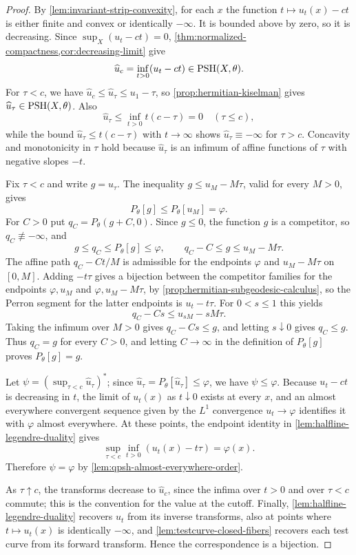 \begin{proof}
By \cref{lem:invariant-strip-convexity}, for each $x$ the function $t\mapsto u_t(x)-ct$ is either finite and convex or identically $-\infty$. It is bounded above by zero, so it is decreasing. Since $\sup_X(u_t-ct)=0$, \cref{thm:normalized-compactness,cor:decreasing-limit} give
\[
 \widehat u_c=\inf_{t>0}(u_t-ct)\in\mathrm{PSH}(X,\theta).
\]
For $\tau<c$, we have $\widehat u_c\leq\widehat u_\tau\leq u_1-\tau$, so \cref{prop:hermitian-kiselman} gives $\widehat u_\tau\in\mathrm{PSH}(X,\theta)$. Also
\[
 \widehat u_\tau\leq\inf_{t>0}t(c-\tau)=0
 \quad(\tau\leq c),
\]
while the bound $\widehat u_\tau\leq t(c-\tau)$ with $t\to\infty$ shows $\widehat u_\tau\equiv-\infty$ for $\tau>c$. Concavity and monotonicity in $\tau$ hold because $\widehat u_\tau$ is an infimum of affine functions of $\tau$ with negative slopes $-t$.

Fix $\tau<c$ and write $g=\widehat u_\tau$. The inequality $g\leq u_M-M\tau$, valid for every $M>0$, gives
\[
 P_\theta[g]\leq P_\theta[u_M]=\varphi.
\]
For $C>0$ put $q_C=P_\theta(g+C,0)$. Since $g\leq0$, the function $g$ is a competitor, so $q_C\not\equiv-\infty$, and
\[
 g\leq q_C\leq P_\theta[g]\leq\varphi,
 \qquad q_C-C\leq g\leq u_M-M\tau.
\]
The affine path $q_C-Ct/M$ is admissible for the endpoints $\varphi$ and $u_M-M\tau$ on $[0,M]$. Adding $-t\tau$ gives a bijection between the competitor families for the endpoints $\varphi,u_M$ and $\varphi,u_M-M\tau$, by \cref{prop:hermitian-subgeodesic-calculus}, so the Perron segment for the latter endpoints is $u_t-t\tau$. For $0<s\leq1$ this yields
\[
 q_C-Cs\leq u_{sM}-sM\tau.
\]
Taking the infimum over $M>0$ gives $q_C-Cs\leq g$, and letting $s\downarrow0$ gives $q_C\leq g$. Thus $q_C=g$ for every $C>0$, and letting $C\to\infty$ in the definition of $P_\theta[g]$ proves $P_\theta[g]=g$.

Let $\psi=(\sup_{\tau<c}\widehat u_\tau)^*$; since $\widehat u_\tau=P_\theta[\widehat u_\tau]\leq\varphi$, we have $\psi\leq\varphi$. Because $u_t-ct$ is decreasing in $t$, the limit of $u_t(x)$ as $t\downarrow0$ exists at every $x$, and an almost everywhere convergent sequence given by the $L^1$ convergence $u_t\to\varphi$ identifies it with $\varphi$ almost everywhere. At these points, the endpoint identity in \cref{lem:halfline-legendre-duality} gives
\[
 \sup_{\tau<c}\inf_{t>0}(u_t(x)-t\tau)=\varphi(x).
\]
Therefore $\psi=\varphi$ by \cref{lem:qpsh-almost-everywhere-order}.

As $\tau\uparrow c$, the transforms decrease to $\widehat u_c$, since the infima over $t>0$ and over $\tau<c$ commute; this is the convention for the value at the cutoff. Finally, \cref{lem:halfline-legendre-duality} recovers $u_t$ from its inverse transforms, also at points where $t\mapsto u_t(x)$ is identically $-\infty$, and \cref{lem:testcurve-closed-fibers} recovers each test curve from its forward transform. Hence the correspondence is a bijection.
\end{proof}

